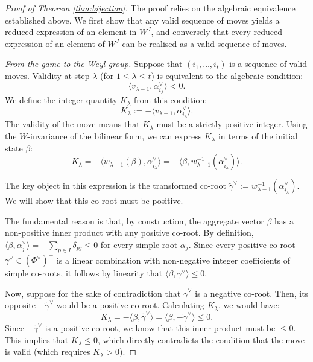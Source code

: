 \documentclass[11pt,a4paper]{amsart}
\theoremstyle{plain}
\theoremstyle{definition}
\theoremstyle{remark}
\begin{document}
\begin{proof}[Proof of Theorem \ref{thm:bijection}]
    The proof relies on the algebraic equivalence established above. We first show that any valid sequence of moves yields a reduced expression of an element in $W^J$, and conversely that every reduced expression of an element of $W^J$ can be realised as a valid sequence of moves.

    \medskip
    \noindent\textit{From the game to the Weyl group.}
    Suppose that $(i_1, \dots, i_t)$ is a sequence of valid moves. Validity at step $\lambda$ (for $1 \le \lambda \le t$) is equivalent to the algebraic condition:
    \[
    \langle v_{\lambda-1}, \alpha_{i_\lambda}^\vee \rangle < 0.
    \]
    We define the integer quantity $K_\lambda$ from this condition:
    \[
    K_\lambda := -\langle v_{\lambda-1}, \alpha_{i_\lambda}^\vee \rangle.
    \]
    The validity of the move means that $K_\lambda$ must be a strictly positive integer. Using the $W$-invariance of the bilinear form, we can express $K_\lambda$ in terms of the initial state $\beta$:
    \[
    K_\lambda = -\langle w_{\lambda-1}(\beta), \alpha_{i_\lambda}^\vee \rangle = -\langle \beta, w_{\lambda-1}^{-1}(\alpha_{i_\lambda}^\vee) \rangle.
    \]

    The key object in this expression is the transformed co-root $\tilde{\gamma}^\vee := w_{\lambda-1}^{-1}(\alpha_{i_\lambda}^\vee)$. We will show that this co-root must be positive.

    The fundamental reason is that, by construction, the aggregate vector $\beta$ has a non-positive inner product with any positive co-root. By definition, $\langle \beta, \alpha_j^\vee \rangle = -\sum_{p\in I}\delta_{pj} \le 0$ for every simple root $\alpha_j$. Since every positive co-root $\gamma^\vee \in (\Phi^\vee)^+$ is a linear combination with non-negative integer coefficients of simple co-roots, it follows by linearity that $\langle \beta, \gamma^\vee \rangle \le 0$.

    Now, suppose for the sake of contradiction that $\tilde{\gamma}^\vee$ is a negative co-root. Then, its opposite $-\tilde{\gamma}^\vee$ would be a positive co-root. Calculating $K_\lambda$, we would have:
    \[
    K_\lambda = -\langle \beta, \tilde{\gamma}^\vee \rangle = \langle \beta, -\tilde{\gamma}^\vee \rangle \le 0.
    \]
    Since $-\tilde{\gamma}^\vee$ is a positive co-root, we know that this inner product must be $\le 0$. This implies that $K_\lambda \le 0$, which directly contradicts the condition that the move is valid (which requires $K_\lambda > 0$).


\end{proof}
\end{document}
